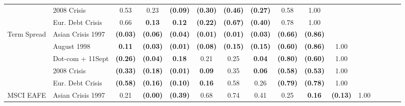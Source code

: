 \documentclass[12pt]{article}
\begin{document}
\begin{table}[H]
{\begin{tabular}{@{}llcccccccccccccc@{}}
                  & 2008 Crisis       & 0.53            & 0.23            & \textbf{(0.09)} & \textbf{(0.30)} & \textbf{(0.46)} & \textbf{(0.27)} & 0.58            & 1.00            &                 &                 &                 &                 &                 &                 \\
                  & Eur. Debt Crisis  & 0.66            & \textbf{0.13}   & \textbf{0.12}   & \textbf{(0.22)} & \textbf{(0.67)} & \textbf{(0.40)} & 0.78            & 1.00            &                 &                 &                 &                 &                 &                 \\
Term Spread       & Asian Crisis 1997 & \textbf{(0.03)} & \textbf{(0.06)} & \textbf{(0.04)} & \textbf{(0.01)} & \textbf{(0.01)} & \textbf{(0.03)} & \textbf{(0.66)} & \textbf{(0.86)} &                 &                 &                 &                 &                 &                 \\
                  & August 1998       & \textbf{0.11}   & \textbf{(0.03)} & \textbf{(0.01)} & \textbf{(0.08)} & \textbf{(0.15)} & \textbf{(0.15)} & \textbf{(0.60)} & \textbf{(0.86)} & 1.00            &                 &                 &                 &                 &                 \\
                  & Dot-com + 11Sept  & \textbf{(0.26)} & \textbf{(0.04)} & \textbf{0.18}   & 0.21            & 0.25            & \textbf{0.04}   & \textbf{(0.80)} & \textbf{(0.60)} & 1.00            &                 &                 &                 &                 &                 \\
                  & 2008 Crisis       & \textbf{(0.33)} & \textbf{(0.18)} & \textbf{(0.01)} & \textbf{0.09}   & 0.35            & \textbf{0.06}   & \textbf{(0.58)} & \textbf{(0.53)} & 1.00            &                 &                 &                 &                 &                 \\
                  & Eur. Debt Crisis  & \textbf{(0.58)} & \textbf{(0.16)} & \textbf{(0.10)} & \textbf{0.16}   & 0.58            & 0.26            & \textbf{(0.79)} & \textbf{(0.78)} & 1.00            &                 &                 &                 &                 &                 \\
MSCI EAFE         & Asian Crisis 1997 & 0.21            & \textbf{(0.00)} & \textbf{(0.39)} & 0.68            & 0.74            & 0.41            & 0.25            & \textbf{0.16}   & \textbf{(0.13)} & 1.00            &                 &                 &                 &                 \\

\end{tabular}}
\end{table}
\end{document}

